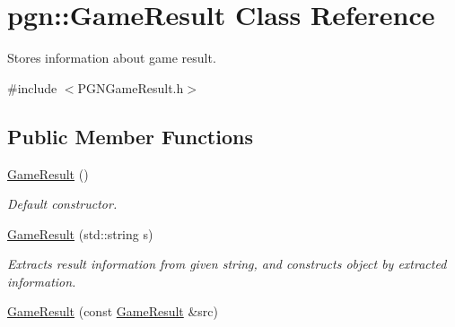 \hypertarget{classpgn_1_1GameResult}{
\section{pgn::GameResult Class Reference}
\label{classpgn_1_1GameResult}
}


Stores information about game result.  




{\ttfamily \#include $<$PGNGameResult.h$>$}

\subsection*{Public Member Functions}
\begin{DoxyCompactItemize}
\item 
\hypertarget{classpgn_1_1GameResult_a8074fdea435bd38c5f972d4b8db2828f}{
\hyperlink{classpgn_1_1GameResult_a8074fdea435bd38c5f972d4b8db2828f}{GameResult} ()}
\label{classpgn_1_1GameResult_a8074fdea435bd38c5f972d4b8db2828f}

\begin{DoxyCompactList}\small\item\em Default constructor. \item\end{DoxyCompactList}\item 
\hyperlink{classpgn_1_1GameResult_a4d0cb12a719e7d7c493c9c0e33bbcec4}{GameResult} (std::string s)
\begin{DoxyCompactList}\small\item\em Extracts result information from given string, and constructs object by extracted information. \item\end{DoxyCompactList}\item 
\hypertarget{classpgn_1_1GameResult_a54ad0cf0520a188b2e50585684090cf3}{
\hyperlink{classpgn_1_1GameResult_a54ad0cf0520a188b2e50585684090cf3}{GameResult} (const \hyperlink{classpgn_1_1GameResult}{GameResult} \&src)}
\label{classpgn_1_1GameResult_a54ad0cf0520a188b2e50585684090cf3}


\end{DoxyCompactItemize}
